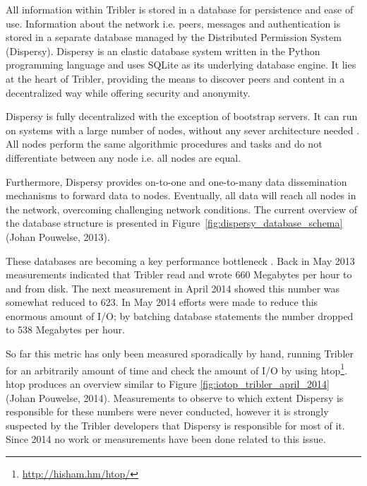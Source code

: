 All information within Tribler is stored in a database for persistence and ease of use.
Information about the network i.e. peers, messages and authentication is stored in a separate database managed by the Distributed Permission System (Dispersy).
Dispersy is an elastic database system written in the Python programming language and uses SQLite as its underlying database engine.
It lies at the heart of Tribler, providing the means to discover peers and content in a decentralized way while offering security and anonymity.

Dispersy is fully decentralized with the exception of bootstrap servers.
It can run on systems with a large number of nodes, without any sever architecture needed \cite{dispersy2016dispersy, zeilemaker2013dispersy}.
All nodes perform the same algorithmic procedures and tasks and do not differentiate between any node i.e. all nodes are equal.

Furthermore, Dispersy provides on-to-one and one-to-many data dissemination mechanisms to forward data to nodes.
Eventually, all data will reach all nodes in the network, overcoming challenging network conditions.
The current overview of the database structure is presented in Figure~\ref{fig:dispersy_database_schema} (Johan Pouwelse, 2013).

These databases are becoming a key performance bottleneck \cite{pouwelse2014reduce}.
Back in May 2013 measurements indicated that Tribler read and wrote 660 Megabytes per hour to and from disk.
The next measurement in April 2014 showed this number was somewhat reduced to 623.
In May 2014 efforts were made to reduce this enormous amount of I/O; by batching database statements the number dropped to 538 Megabytes per hour.

So far this metric has only been measured sporadically by hand, running Tribler for an arbitrarily amount of time and check the amount of I/O by using htop\footnote{\url{http://hisham.hm/htop/}}.
htop produces an overview similar to Figure \ref{fig:iotop_tribler_april_2014} (Johan Pouwelse, 2014).
Measurements to observe to which extent Dispersy is responsible for these numbers were never conducted, however it is strongly suspected by the Tribler developers that Dispersy is responsible for most of it.
Since 2014 no work or measurements have been done related to this issue.

